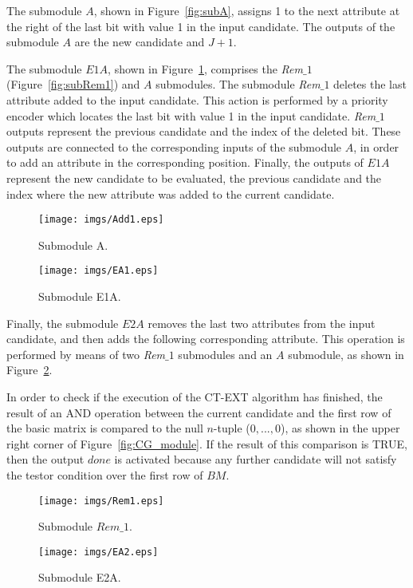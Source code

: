 \documentclass[letterpaper, twoside, openright, 12pt]{book}%
\begin{document}
	The submodule $A$, shown in Figure~\ref{fig:subA}, assigns 1 to the next attribute at the right of the last bit with value 1 in the input candidate. The outputs of the submodule $A$ are the new candidate and $J+1$.
	
	The submodule $E1A$, shown in Figure~\ref{fig:subEA1}, comprises the \textit{Rem$\_1$} (Figure~\ref{fig:subRem1}) and $A$ submodules. The submodule \textit{Rem$\_1$} deletes the last attribute added to the input candidate. This action is performed by a priority encoder which locates the last bit with value 1 in the input candidate. \textit{Rem$\_1$} outputs represent the previous candidate and the index of the deleted bit. These outputs are connected to the corresponding inputs of the submodule $A$, in order to add an attribute in the corresponding position. Finally, the outputs of $E1A$ represent the new candidate to be evaluated, the previous candidate and the index where the new attribute was added to the current candidate. 
	
	\begin{figure}[htb]
	\centering
	\begin{minipage}{.5\textwidth}
	  \centering
	   \texttt{[image: imgs/Add1.eps]}
	  \caption{Submodule A.}
	  \label{fig:subA}
	\end{minipage}%
	\begin{minipage}{.5\textwidth}
	  \centering
	   \texttt{[image: imgs/EA1.eps]}
	  \caption{Submodule E1A.}
	  \label{fig:subEA1}
	\end{minipage}
	\end{figure}
	
	Finally, the submodule $E2A$ removes the last two attributes from the input candidate, and then adds the following corresponding attribute. This operation is performed by means of two \textit{Rem$\_1$} submodules and an $A$ submodule, as shown in Figure~\ref{fig:subEA2}.
	
	In order to check if the execution of the CT-EXT  algorithm has finished, the result of an AND operation between the current candidate and the first row of the basic matrix is compared to the null $n$-tuple ($0,...,0$), as shown in the upper right corner of Figure~\ref{fig:CG_module}. If the result of this comparison is TRUE, then the output $done$ is activated because any further candidate will not satisfy the testor condition over the first row of $BM$. %
	
	\begin{figure}[htb]
	\centering
	\begin{minipage}{.5\textwidth}
	  \centering
	   \texttt{[image: imgs/Rem1.eps]}
	  \caption{Submodule $Rem\_1$.}
	  \label{fig:subRem1}
	\end{minipage}%
	\begin{minipage}{.5\textwidth}
	  \centering
	   \texttt{[image: imgs/EA2.eps]}
	  \caption{Submodule E2A.}
	  \label{fig:subEA2}
	\end{minipage}
	\end{figure}
\end{document}
